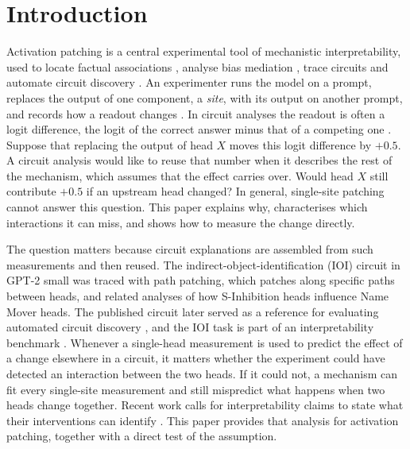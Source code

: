 \documentclass{article}
\theoremstyle{plain}
\theoremstyle{definition}
\begin{document}
\section{Introduction}
\label{sec:intro}

Activation patching is a central experimental tool of mechanistic interpretability, used to locate factual associations
\citep{meng2022locating}, analyse bias mediation \citep{vig2020gender}, trace circuits
\citep{wang2022ioi,hanna2023greater} and automate circuit discovery \citep{conmy2023acdc}. An experimenter runs the model on a prompt, replaces
the output of one component, a \emph{site}, with its output on another prompt, and records how a readout changes
\citep{zhang2024patching,heimersheim2024patching}. In circuit analyses the readout is often a logit difference, the
logit of the correct answer minus that of a competing one \citep{wang2022ioi}. Suppose that replacing the output of
head $X$ moves this logit difference by $+0.5$. A circuit analysis would like to reuse that number when it describes
the rest of the mechanism, which assumes that the effect carries over. Would head $X$ still contribute $+0.5$ if an
upstream head changed? In general, single-site patching cannot answer this question. This paper explains why, characterises which
interactions it can miss, and shows how to measure the change directly.

The question matters because circuit explanations are assembled from such measurements and then reused. The
indirect-object-identification (IOI) circuit in GPT-2 small \citep{wang2022ioi} was traced with path patching, which patches along specific paths between heads, and
related analyses of how S-Inhibition heads influence Name Mover heads. The published circuit later served as a
reference for evaluating automated circuit discovery \citep{conmy2023acdc}, and the IOI task is part of an
interpretability benchmark \citep{mueller2025mib}. Whenever a single-head measurement is used to predict the effect of
a change elsewhere in a circuit, it matters whether the experiment could have detected an interaction between the two
heads. If it could not, a mechanism can fit every single-site measurement and still mispredict what happens when two
heads change together. Recent work calls for interpretability claims to state what their interventions can identify
\citep{joshi2026causality,lin2026disclose}. This paper provides that analysis for activation patching, together with a
direct test of the assumption.
\end{document}
